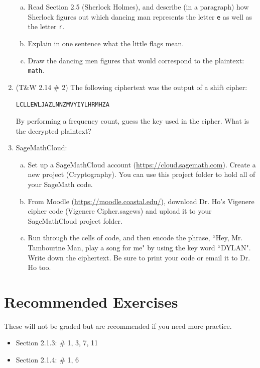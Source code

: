 \documentclass[12pt]{amsart}
\theoremstyle{plain}
\theoremstyle{definition}
\begin{document}
\begin{enumerate}[1.]
		\begin{enumerate}[a.]
			\item Read Section 2.5 (Sherlock Holmes), and describe (in a paragraph) how Sherlock figures out which dancing man represents the letter \texttt{e} as well as the letter \texttt{r}.\\ \begin{framed}\vspace{2in}\end{framed}
			\item Explain in one sentence what the little flags mean.\\\begin{framed}\vspace{1in}\end{framed}
			\item Draw the dancing men figures that would correspond to the plaintext: \texttt{math}.\\ \begin{framed}\vspace{1.5in}\end{framed}
		\end{enumerate}
		\newpage \item (T\&W 2.14 \# 2)  The following ciphertext was the output of a shift cipher:
		\begin{center}
			\texttt{LCLLEWLJAZLNNZMVYIYLHRMHZA}
		\end{center}
		By performing a frequency count, guess the key used in the cipher.  What is the decrypted plaintext?\\ \begin{framed}\vspace{2in}\end{framed}
	\item SageMathCloud:\\
		\begin{enumerate}[a.]
			\item Set up a SageMathCloud account (\url{https://cloud.sagemath.com}).  Create a new project (Cryptography).  You can use this project folder to hold all of your SageMath code.  \\
			\item From Moodle (\url{https://moodle.coastal.edu/}), download Dr. Ho's Vigenere cipher code (Vigenere Cipher.sagews) and upload it to your SageMathCloud project folder.\\
			\item Run through the cells of code, and then encode the phrase, ``Hey, Mr. Tambourine Man, play a song for me" by using the key word ``DYLAN".  Write down the ciphertext.  Be sure to print your code or email it to Dr. Ho too.\\ \begin{framed}\vspace{.5in}\end{framed}
		\end{enumerate}
\end{enumerate}

\section{Recommended Exercises}
\noindent These will not be graded but are recommended if you need more practice.
\begin{itemize}
	\item Section 2.1.3: \# 1, 3, 7, 11
	\item Section 2.1.4: \# 1, 6
\end{itemize}
	
\end{document}
